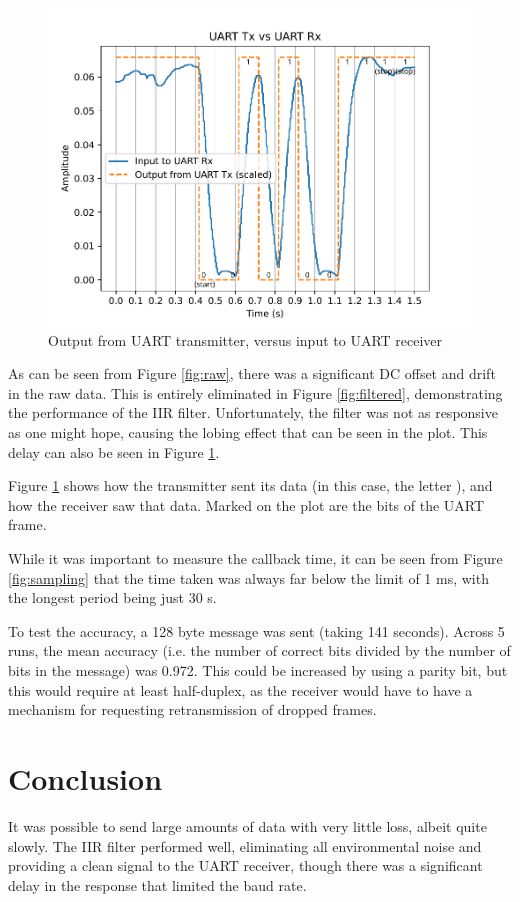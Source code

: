 \documentclass{article}
\begin{document}
\begin{multicols}{2}
\begin{figure}[H]
    \includegraphics[width=\linewidth]{figures/uart_f.pdf}
    \caption{Output from UART transmitter, versus input to UART receiver}
    \label{fig:uart}
\end{figure}

As can be seen from Figure \ref{fig:raw}, there was a significant DC offset and drift in the raw data. This is entirely eliminated in Figure \ref{fig:filtered}, demonstrating the performance of the IIR filter. Unfortunately, the filter was not as responsive as one might hope, causing the lobing effect that can be seen in the plot. This delay can also be seen in Figure \ref{fig:uart}. 

Figure \ref{fig:uart} shows how the transmitter sent its data (in this case, the letter ), and how the receiver saw that data. Marked on the plot are the bits of the UART frame.

While it was important to measure the callback time, it can be seen from Figure \ref{fig:sampling} that the time taken was always far below the limit of 1 ms, with the longest period being just 30 \textmu s.

To test the accuracy, a 128 byte message was sent (taking 141 seconds). Across 5 runs, the mean accuracy (i.e. the number of correct bits divided by the number of bits in the message) was 0.972. This could be increased by using a parity bit, but this would require at least half-duplex, as the receiver would have to have a mechanism for requesting retransmission of dropped frames. 

\section{Conclusion}
It was possible to send large amounts of data with very little loss, albeit quite slowly. The IIR filter performed well, eliminating all environmental noise and providing a clean signal to the UART receiver, though there was a significant delay in the response that limited the baud rate.


\end{multicols}
\end{document}
